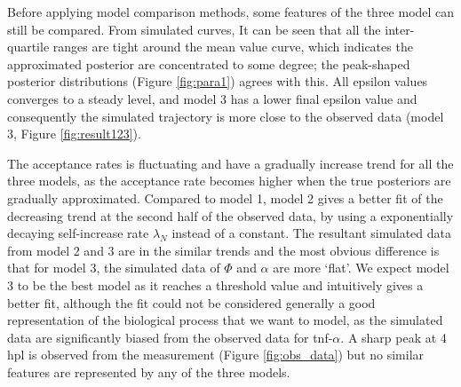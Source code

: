 Before applying model comparison methods, some features of the three model can still be compared. From simulated curves, It can be seen that all the inter-quartile ranges are tight around the mean value curve, which indicates the approximated posterior are concentrated to some degree; the peak-shaped posterior distributions (Figure \ref{fig:para1}) agrees with this. All epsilon values converges to a steady level, and model 3 has a lower final epsilon value and consequently the simulated trajectory is more close to the observed data (model 3, Figure \ref{fig:result123}).

The acceptance rates is fluctuating and have a gradually increase trend for all the three models, as the acceptance rate becomes higher when the true posteriors are gradually approximated. Compared to model 1, model 2 gives a better fit of the decreasing trend at the second half of the observed data, by using a exponentially decaying self-increase rate $\lambda_N$ instead of a constant. The resultant simulated data from model 2 and 3 are in the similar trends and the most obvious difference is that for model 3, the simulated data of $\Phi$ and $\alpha$ are more `flat'. We expect model 3 to be the best model as it reaches a threshold value and intuitively gives a better fit, although the fit could not be considered generally a good representation of the biological process that we want to model, as the simulated data are significantly biased from the observed data for tnf-$\alpha$. A sharp peak at 4 hpl is observed from the measurement (Figure \ref{fig:obs_data}) but no similar features are represented by any of the three models.

